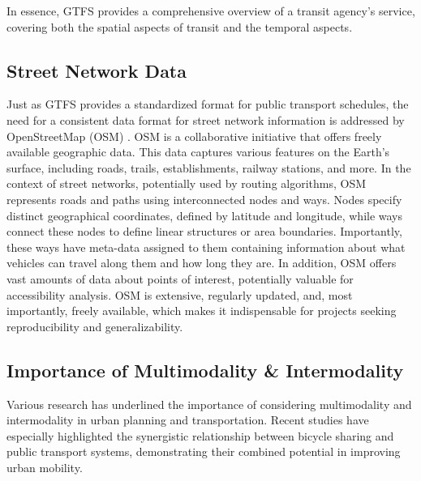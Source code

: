 
In essence, GTFS provides a comprehensive overview of a transit agency's service, covering both the spatial aspects of transit and the temporal aspects.

\subsection{Street Network Data}
\label{subsec:street_network_data}

Just as GTFS provides a standardized format for public transport schedules, the need for a consistent data format for street network information is addressed by OpenStreetMap (OSM) .
OSM is a collaborative initiative that offers freely available geographic data.
This data captures various features on the Earth's surface, including roads, trails, establishments, railway stations, and more.
In the context of street networks, potentially used by routing algorithms, OSM represents roads and paths using interconnected nodes and ways.
Nodes specify distinct geographical coordinates, defined by latitude and longitude, while ways connect these nodes to define linear structures or area boundaries.
Importantly, these ways have meta-data assigned to them containing information about what vehicles can travel along them and how long they are.
In addition, OSM offers vast amounts of data about points of interest, potentially valuable for accessibility analysis.
OSM is extensive, regularly updated, and, most importantly, freely available, which makes it indispensable for projects seeking reproducibility and generalizability.


\subsection{Importance of Multimodality \& Intermodality}
\label{subsec:importance_of_multimodality_and_intermodality}
Various research has underlined the importance of considering multimodality and intermodality in urban planning and transportation.
Recent studies have especially highlighted the synergistic relationship between bicycle sharing and public transport systems, demonstrating their combined potential in improving urban mobility.

